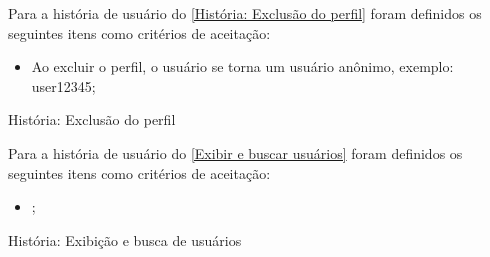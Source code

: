 Para a história de usuário do \autoref{História: Exclusão do perfil} foram definidos os seguintes itens como critérios de aceitação:

\begin{itemize}
\item Ao excluir o perfil, o usuário se torna um usuário anônimo, exemplo: user12345;
\end{itemize}

\def\arraystretch{2}
\begin{quadro}[htb]
\centering
\ABNTEXfontereduzida
\caption[História: Exclusão do perfil]{História: Exclusão do perfil}
\label{História: Exclusão do perfil}
\end{quadro}
\FloatBarrier 

Para a história de usuário do \autoref{Exibir e buscar usuários} foram definidos os seguintes itens como critérios de aceitação:

\begin{itemize}
\item ;
\end{itemize}

\def\arraystretch{2}
\begin{quadro}[htb]
\centering
\ABNTEXfontereduzida
\caption[História: Exibir e buscar usuários]{História: Exibição e busca de usuários}
\label{Exibir e buscar usuários}
\end{quadro}
\FloatBarrier

